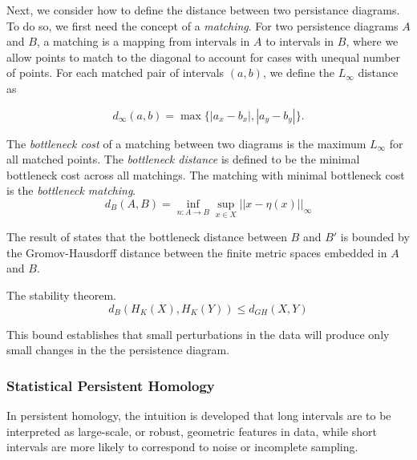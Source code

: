 Next, we consider how to define the distance between two persistance diagrams.
To do so, we first need the concept of a \emph{matching}.
For two persistence diagrams $A$ and $B$, a matching is a mapping from intervals in $A$ to intervals in $B$, where we allow points to match to the diagonal to account for cases with unequal number of points.
For each matched pair of intervals $(a,b)$, we define the $L_{\infty}$ distance as

\begin{equation}
d_{\infty}(a,b) = \max\{ |a_{x}-b_{x}|, |a_{y}-b_{y}| \}.
\end{equation}


\begin{defn}
\label{defn:bottleneck}
The \emph{bottleneck cost} of a matching between two diagrams is the maximum $L_{\infty}$ for all matched points. The \emph{bottleneck distance} is defined to be the minimal bottleneck cost across all matchings. The matching with minimal bottleneck cost is the \emph{bottleneck matching}.
\begin{equation}
d_{B}(A,B) = \inf_{n:A\rightarrow B} \sup_{x\in X} ||x-\eta(x)||_{\infty}
\end{equation}
\end{defn}

The result of \citet{Chazal:2009wc} states that the bottleneck distance between $B$ and $B'$ is bounded by the Gromov-Hausdorff distance between the finite metric spaces embedded in $A$ and $B$.

\begin{thm}
\label{thm:stability}
The stability theorem.
\begin{equation}
d_{B}(H_{K}(X),H_{K}(Y)) \leq d_{GH}(X,Y)
\end{equation}
\end{thm}

This bound establishes that small perturbations in the data will produce only small changes in the the persistence diagram.

\subsubsection{Statistical Persistent Homology}
\label{subsubsec:ph_statistics}

In persistent homology, the intuition is developed that long intervals are to be interpreted as large-scale, or robust, geometric features in data, while short intervals are more likely to correspond to noise or incomplete sampling.


